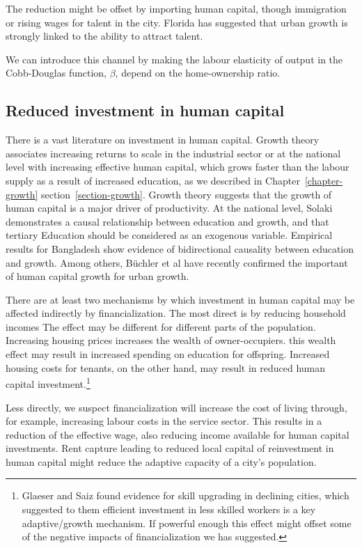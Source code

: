 The reduction might be offset by importing human capital, though immigration or rising wages for talent in the city. Florida\cite{floridaCompetingAgeTalent2005, floridaCreativeClassEconomic2014} has suggested that urban growth is strongly linked to the ability to attract talent. 

We can introduce this channel by making the labour elasticity of output in the Cobb-Douglas function, $\beta$, depend on the home-ownership ratio.  


\subsection{Reduced investment in human capital}

There is a vast literature on investment in human capital. 
Growth theory associates increasing returns to scale in the industrial sector or at the national level with increasing effective human capital, which grows faster than the labour supply as a result of increased education, as we described in Chapter~\ref{chapter-growth} section~\ref{section-growth}. 
Growth theory suggests that the growth of human capital is  a major driver of productivity.  At the national level, Solaki \cite{solakiRelationshipEducationGDP2013} demonstrates a causal relationship between education and growth, and that tertiary Education should be considered as an exogenous variable.  Empirical results for Bangladesh \cite{islam2007relationship}show evidence of bidirectional causality between education and growth.  Among others, B\"uchler et al have recently confirmed the important of human capital growth for urban growth.

There are at least two mechanisms by which investment in human capital may be affected indirectly by financialization. The most direct is by reducing household incomes The effect may be different for different parts of the population. Increasing housing prices increases the wealth of owner-occupiers. this wealth effect may result in increased spending on education for offspring. Increased housing costs for tenants, on the other hand,  may result in reduced human capital investment.\footnote{Glaeser and Saiz found evidence for skill upgrading in declining cities, which suggested to them efficient investment in less skilled workers is a key adaptive/growth mechanism. If powerful enough this effect might offset some of the negative impacts of financialization we has suggested.}  

Less directly, we suspect financialization will increase the cost of living through, for example, increasing labour costs in the service sector. This results in a reduction of the effective wage, also reducing income available for human capital investments. Rent capture leading to reduced local capital of reinvestment in human capital might reduce the adaptive capacity of a city's population.

